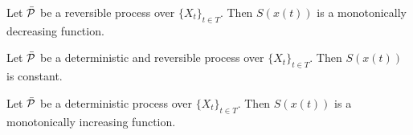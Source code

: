 \documentclass[letterpaper]{article}
\begin{document}
\begin{prop}
	Let $\tdomain[P]$ be a reversible process over $\{X_t\}_{t \in T}$. Then $S(x(t))$ is a monotonically decreasing function.
\end{prop}

\begin{prop}
	Let $\tdomain[P]$ be a deterministic and reversible process over $\{X_t\}_{t \in T}$. Then $S(x(t))$ is constant.
\end{prop}

\begin{prop}
	Let $\tdomain[P]$ be a deterministic process over $\{X_t\}_{t \in T}$. Then $S(x(t))$ is a monotonically increasing function.
\end{prop}


\end{document}
